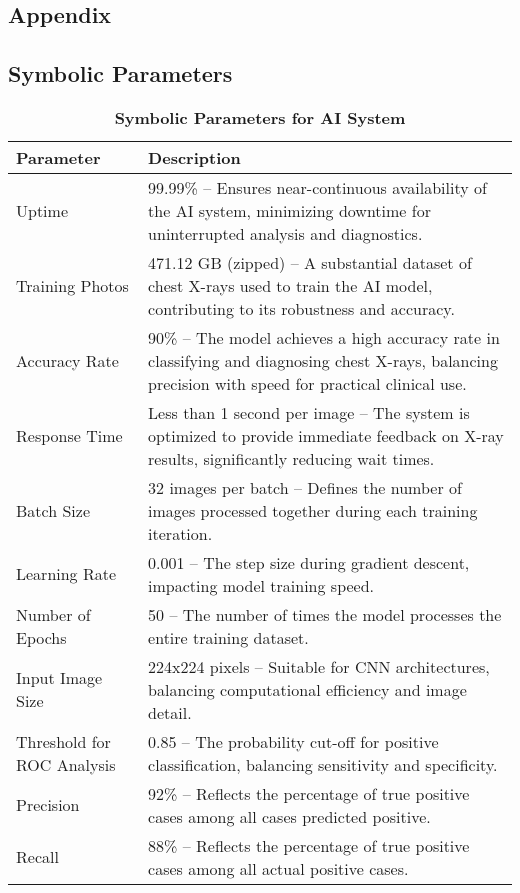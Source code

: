 \documentclass[12pt, titlepage]{article}
\begin{document}
\begin{enumerate}
\begin{enumerate}
\begin{enumerate}


\newpage

\section{Appendix}

\subsection{Symbolic Parameters}
\renewcommand{\arraystretch}{1.3}

\begin{table}[H]
  \centering
  \noindent
  \begin{tabular}{|p{3.5cm}|p{9.5cm}|}
      \hline
      \rowcolor{lightgray} \textbf{Parameter} & \textbf{Description} \\
      \hline
      Uptime & 99.99\% – Ensures near-continuous availability of the AI system, minimizing downtime for uninterrupted analysis and diagnostics. \\
      \hline
      Training Photos & 471.12 GB (zipped) – A substantial dataset of chest X-rays used to train the AI model, contributing to its robustness and accuracy. \\
      \hline
      Accuracy Rate & 90\% – The model achieves a high accuracy rate in classifying and diagnosing chest X-rays, balancing precision with speed for practical clinical use. \\
      \hline
      Response Time & Less than 1 second per image – The system is optimized to provide immediate feedback on X-ray results, significantly reducing wait times. \\
      \hline
      Batch Size & 32 images per batch – Defines the number of images processed together during each training iteration. \\
      \hline
      Learning Rate & 0.001 – The step size during gradient descent, impacting model training speed. \\
      \hline
      Number of Epochs & 50 – The number of times the model processes the entire training dataset. \\
      \hline
      Input Image Size & 224x224 pixels – Suitable for CNN architectures, balancing computational efficiency and image detail. \\
      \hline
      Threshold for ROC Analysis & 0.85 – The probability cut-off for positive classification, balancing sensitivity and specificity. \\
      \hline
      Precision & 92\% – Reflects the percentage of true positive cases among all cases predicted positive. \\
      \hline
      Recall & 88\% – Reflects the percentage of true positive cases among all actual positive cases. \\
      \hline
  \end{tabular}
  \caption{\textbf{Symbolic Parameters for AI System}}
\end{table}



\end{enumerate}
\end{enumerate}
\end{enumerate}
\end{document}
